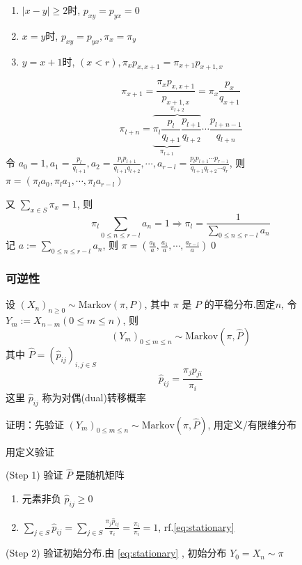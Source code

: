\begin{enumerate}
    \item $|x-y|\geq 2$时, $p_{xy}=p_{yx}=0$
    \item $x=y$时, $p_{xy}=p_{yx},\pi_x=\pi_y$
    \item $y=x+1$时, $(x<r),\pi_x p_{x,x+1}=\pi_{x+1}p_{x+1,x}$
\end{enumerate}
\[
\pi_{x+1}=\frac{\pi_x p_{x,x+1}}{p_{x+1,x}}=\pi_x\frac{p_x}{q_{x+1}}
\]
\[
\pi_{l+n}=\overbrace{\underbrace{\pi_l\frac{p_l}{q_{l+1}}}_{\pi_{l+1}} \frac{p_{l+1}}{q_{l+2}}}^{\pi_{l+2}}\cdots \frac{p_{l+n-1}}{q_{l+n}}
\]
令 $a_0=1,a_1=\frac{p_l}{q_{l+1}},a_2=\frac{p_l p_{l+1}}{q_{l+1} q_{l+2}},\cdots,a_{r-l}=\frac{p_lp_{l+1}\cdots p_{r-1}}{q_{l+1}q_{l+2}\cdots q_r}$, 则 $\pi=(\pi_l a_0,\pi_l a_1,\cdots, \pi_l a_{r-l})$

又 $\sum_{x\in S}\pi_x=1$, 则
\[
\pi_l\sum_{0\leq n\leq r-l}a_n=1\Rightarrow \pi_l=\frac{1}{\sum_{0\leq n\leq r-l}a_n}
\]
记 $a:=\sum_{0\leq n\leq r-l}a_n$, 则 $\pi=(\frac{a_0}{a},\frac{a_1}{a},\cdots,\frac{a_{r-l}}{a})$\qed

\subsubsection{可逆性}

\begin{theorem}
    设 $(X_n)_{n\geq 0}\sim \text{Markov}(\pi,P)$, 其中 $\pi$ 是 $P$ 的平稳分布.固定$n$, 令 $Y_m:=X_{n-m}(0\leq m\leq n)$, 则
    \[
    (Y_m)_{0\leq m\leq n}\sim\text{Markov}(\pi,\hat{P})
    \]
    其中 $\hat{P}=(\hat{p}_{ij})_{i,j\in S}$
    \[
    \hat{p}_{ij}=\frac{\pi_j p_{ji}}{\pi_i}
    \]
    这里 $\hat{p}_{ij}$ 称为对偶(dual)转移概率
\end{theorem}

证明：先验证 $(Y_m)_{0\leq m\leq n}\sim \text{Markov}(\pi,\hat{P})$, 用定义/有限维分布

用定义验证

(Step 1) 验证 $\hat{P}$ 是随机矩阵
\begin{enumerate}
    \item 元素非负 $\hat{p}_{ij}\geq 0$
    \item $\sum_{j\in S}\hat{p}_{ij}=\sum_{j\in S}\frac{\pi_j\hat{p}_{ij}}{\pi_i}=\frac{\pi_i}{\pi_i}=1$, rf.\eqref{eq:stationary}
\end{enumerate}

(Step 2) 验证初始分布.由 \eqref{eq:stationary} , 初始分布 $Y_0=X_n\sim \pi$

